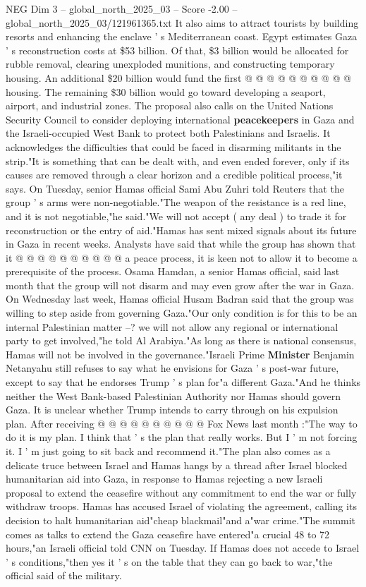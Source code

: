 \begin{textsample}{NEG Dim 3 – global\_north\_2025\_03 – Score -2.00 – global\_north\_2025\_03/121961365.txt}
It also aims to attract tourists by building resorts and enhancing the enclave ' s Mediterranean coast.
Egypt estimates Gaza ' s reconstruction costs at \$53 billion.
Of that, \$3 billion would be allocated for rubble removal, clearing unexploded munitions, and constructing temporary housing.
An additional \$20 billion would fund the first @ @ @ @ @ @ @ @ @ @ housing.
The remaining \$30 billion would go toward developing a seaport, airport, and industrial zones.
The proposal also calls on the United Nations Security Council to consider deploying international \textbf{peacekeepers} in Gaza and the Israeli-occupied West Bank to protect both Palestinians and Israelis.
It acknowledges the difficulties that could be faced in disarming militants in the strip."It is something that can be dealt with, and even ended forever, only if its causes are removed through a clear horizon and a credible political process,"it says.
On Tuesday, senior Hamas official Sami Abu Zuhri told Reuters that the group ' s arms were non-negotiable."The weapon of the resistance is a red line, and it is not negotiable,"he said."We will not accept ( any deal ) to trade it for reconstruction or the entry of aid."Hamas has sent mixed signals about its future in Gaza in recent weeks.
Analysts have said that while the group has shown that it @ @ @ @ @ @ @ @ @ @ a peace process, it is keen not to allow it to become a prerequisite of the process.
Osama Hamdan, a senior Hamas official, said last month that the group will not disarm and may even grow after the war in Gaza.
On Wednesday last week, Hamas official Husam Badran said that the group was willing to step aside from governing Gaza."Our only condition is for this to be an internal Palestinian matter --? we will not allow any regional or international party to get involved,"he told Al Arabiya."As long as there is national consensus, Hamas will not be involved in the governance."Israeli Prime \textbf{Minister} Benjamin Netanyahu still refuses to say what he envisions for Gaza ' s post-war future, except to say that he endorses Trump ' s plan for"a different Gaza."And he thinks neither the West Bank-based Palestinian Authority nor Hamas should govern Gaza.
It is unclear whether Trump intends to carry through on his expulsion plan.
After receiving @ @ @ @ @ @ @ @ @ @ Fox News last month :"The way to do it is my plan.
I think that ' s the plan that really works.
But I ' m not forcing it.
I ' m just going to sit back and recommend it."The plan also comes as a delicate truce between Israel and Hamas hangs by a thread after Israel blocked humanitarian aid into Gaza, in response to Hamas rejecting a new Israeli proposal to extend the ceasefire without any commitment to end the war or fully withdraw troops.
Hamas has accused Israel of violating the agreement, calling its decision to halt humanitarian aid"cheap blackmail"and a"war crime."The summit comes as talks to extend the Gaza ceasefire have entered"a crucial 48 to 72 hours,"an Israeli official told CNN on Tuesday.
If Hamas does not accede to Israel ' s conditions,"then yes it ' s on the table that they can go back to war,"the official said of the military.

\end{textsample}

